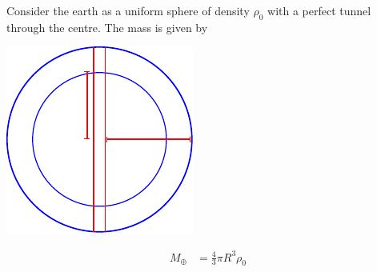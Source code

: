 \documentclass[british]{article}
\begin{document}
Consider the earth as a uniform sphere of density $\rho_0$ with a perfect tunnel through the centre. The mass is given by

\begin{minipage}{.6\textwidth}
	\centering
	\includegraphics{"Structure in the Universe/earth_tunnel"}
	\label{fig:figure}
\end{minipage}
\begin{minipage}{0.1\textwidth}
\begin{align*}
	M_\oplus &= \frac{4}{3} \pi R^3 \rho_0
\end{align*}
\end{minipage}
\end{document}
